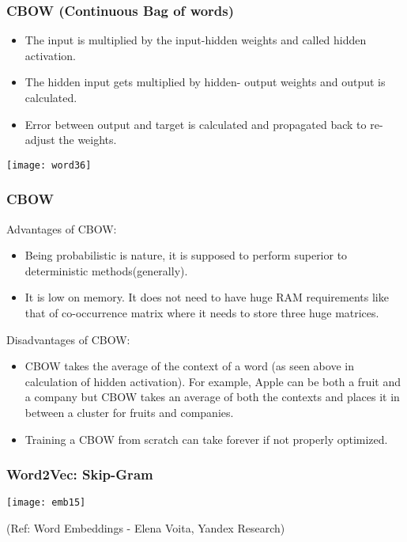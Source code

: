 \begin{frame}[fragile]\frametitle{CBOW (Continuous Bag of words)}
\begin{itemize}
\item The input is multiplied by the input-hidden weights and called hidden activation. 
\item The hidden input gets multiplied by hidden- output weights and output is calculated.
\item Error between output and target is calculated and propagated back to re-adjust the weights.
\end{itemize}
\begin{center}
\texttt{[image: word36]}
\end{center}
\end{frame}

\begin{frame}[fragile]\frametitle{CBOW}
Advantages of CBOW:
\begin{itemize}
\item  Being probabilistic is nature, it is supposed to perform superior to deterministic methods(generally).
\item      It is low on memory. It does not need to have huge RAM requirements like that of co-occurrence matrix where it needs to store three huge matrices.
\end{itemize}
Disadvantages  of CBOW:
\begin{itemize}
\item  CBOW takes the average of the context of a word (as seen above in calculation of hidden activation). For example, Apple can be both a fruit and a company but CBOW takes an average of both the contexts and places it in between a cluster for fruits and companies.
\item  Training a CBOW from scratch can take forever if not properly optimized.
\end{itemize}
\end{frame}


\begin{frame}[fragile]\frametitle{Word2Vec: Skip-Gram}
\begin{center}
\texttt{[image: emb15]}
\end{center}

{\tiny (Ref: Word Embeddings - Elena Voita, Yandex Research)}
\end{frame}


